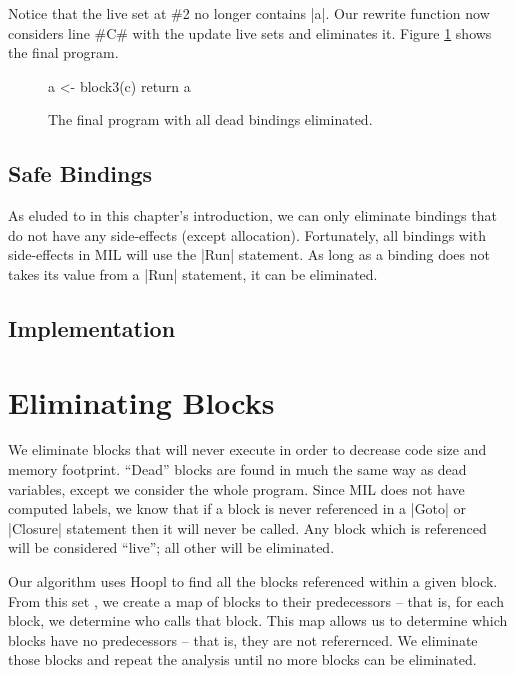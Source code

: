 \documentclass[12pt]{report}
\begin{document}
Notice that the live set at \#2 no longer contains |a|. Our rewrite
function now considers line #C# with the update live sets and
eliminates it. Figure \ref{fig_dead3} shows the final program.

\begin{figure}[h]
  \begin{code}
    a <- block3(c)
    return a 
  \end{code}
  \caption{The final program with all dead bindings eliminated.}
  \label{fig_dead3}
\end{figure}


\subsection*{Safe Bindings}

As eluded to in this chapter's introduction, we can only eliminate
bindings that do not have any side-effects (except
allocation). Fortunately, all bindings with side-effects in MIL will
use the |Run| statement. As long as a binding does not takes its value
from a |Run| statement, it can be eliminated.

\subsection*{Implementation}


\section{Eliminating Blocks}


We eliminate blocks that will never execute in order to decrease code
size and memory footprint. ``Dead'' blocks are found in much the same
way as dead variables, except we consider the whole program. Since MIL
does not have computed labels, we know that if a block is never
referenced in a |Goto| or |Closure| statement then it will never be
called. Any block which is referenced will be considered ``live''; all
other will be eliminated.

Our algorithm uses Hoopl to find all the blocks referenced within a
given block. From this set , we create a map of blocks to their
predecessors -- that is, for each block, we determine who calls that
block. This map allows us to determine which blocks have no
predecessors -- that is, they are not referernced. We eliminate those
blocks and repeat the analysis until no more blocks can be eliminated.
\end{document}

